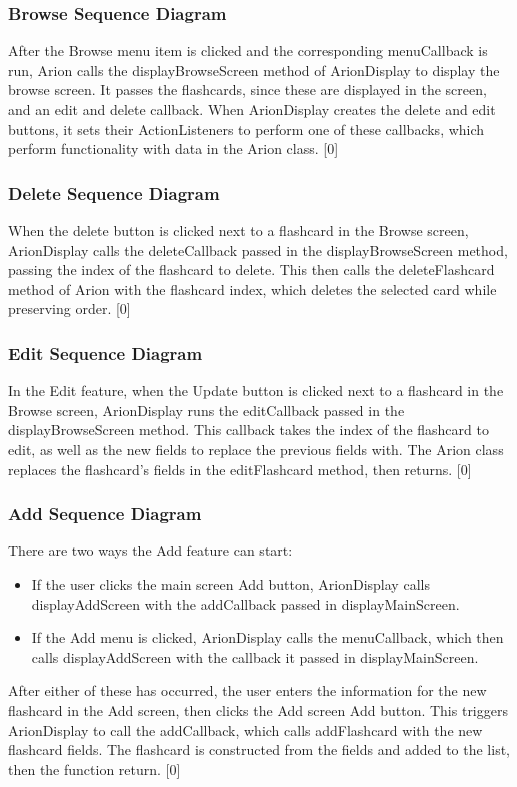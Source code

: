 \documentclass{scrreprt}
\begin{document}
\subsubsection*{Browse Sequence Diagram}
After the Browse menu item is clicked and the corresponding menuCallback is run,
    Arion calls the displayBrowseScreen method of ArionDisplay to display the browse screen.
It passes the flashcards, since these are displayed in the screen, and an edit and delete callback.
When ArionDisplay creates the delete and edit buttons, it sets their ActionListeners to perform one of these callbacks,
    which perform functionality with data in the Arion class.
[0]

\subsubsection*{Delete Sequence Diagram}
When the delete button is clicked next to a flashcard in the Browse screen,
    ArionDisplay calls the deleteCallback passed in the displayBrowseScreen method, passing the index of the flashcard to delete.
This then calls the deleteFlashcard method of Arion with the flashcard index,
    which deletes the selected card while preserving order.
[0]

\subsubsection*{Edit Sequence Diagram}
In the Edit feature, when the Update button is clicked next to a flashcard in the Browse screen,
    ArionDisplay runs the editCallback passed in the displayBrowseScreen method.
This callback takes the index of the flashcard to edit, as well as the new fields to replace the previous fields with.
The Arion class replaces the flashcard's fields in the editFlashcard method, then returns.
[0]

\subsubsection*{Add Sequence Diagram}
There are two ways the Add feature can start:
\begin{itemize}
    \item If the user clicks the main screen Add button, ArionDisplay calls displayAddScreen with
        the addCallback passed in displayMainScreen.
    \item If the Add menu is clicked, ArionDisplay calls the menuCallback, which then calls displayAddScreen with
        the callback it passed in displayMainScreen.
\end{itemize}
After either of these has occurred, the user enters the information for the new flashcard in the Add screen, then clicks the Add screen Add button.
This triggers ArionDisplay to call the addCallback, which calls addFlashcard with the new flashcard fields.
The flashcard is constructed from the fields and added to the list, then the function return.
[0]
\end{document}
